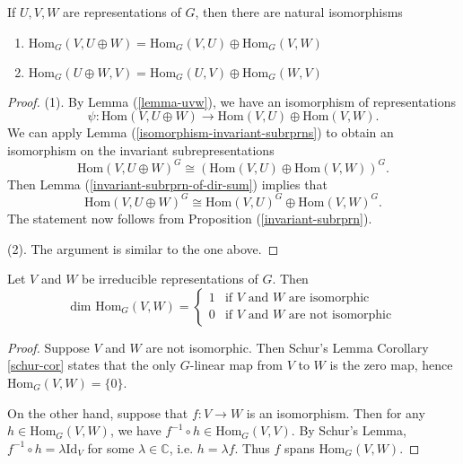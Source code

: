 \begin{cor}\label{invariant-subrprns-hom-spaces}
If  $U, V, W$ are representations of $G$, then there are natural isomorphisms
\begin{enumerate}
\item $\text{Hom}_G(V, U \oplus W) = \text{Hom}_G(V,U) \oplus \text{Hom}_G(V,W)$
\item $\text{Hom}_G(U \oplus W, V) = \text{Hom}_G(U, V) \oplus \text{Hom}_G(W ,V)$
\end{enumerate}
\end{cor}
\begin{proof}
(1). By Lemma (\ref{lemma-uvw}), we have an isomorphism of representations 
\[ \psi \colon \text{Hom}(V, U \oplus W) \to \text{Hom}(V, U) \oplus \text{Hom}(V,W). \]
We can apply Lemma (\ref{isomorphism-invariant-subrprns}) to obtain an isomorphism on the invariant subrepresentations
\[\text{Hom}(V, U \oplus W)^G \cong (\text{Hom}(V, U) \oplus \text{Hom}(V,W))^G.\]
Then Lemma (\ref{invariant-subrprn-of-dir-sum}) implies that 
\[\text{Hom}(V, U \oplus W)^G \cong \text{Hom}(V, U)^G \oplus \text{Hom}(V,W)^G. \]
The statement now follows from Proposition (\ref{invariant-subrprn}).

(2). The argument is similar to the one above.
\end{proof}

\begin{prop}\label{schurs-lemma-homvw}
Let $V$ and $W$ be irreducible representations of $G$.  Then
\[ \text{dim Hom}_G (V,W) =  \begin{cases} 
1 & \mbox{if $V$ and $W$ are isomorphic}  \\
0 &\mbox{if $V$ and $W$ are not isomorphic}
\end{cases} \]
\end{prop}
\begin{proof}
Suppose $V$ and $W$ are not isomorphic.  Then Schur's Lemma Corollary \ref{schur-cor} states that the only $G$-linear map from $V$ to $W$ is the zero map, hence $\text{Hom}_G(V,W) = \{ 0 \} $.

On the other hand, suppose that $f \colon V \to W$ is an isomorphism.  Then for any $h \in \text{Hom}_G(V,W)$, we have $f^{-1} \circ h \in \text{Hom}_G(V,V)$.  By Schur's Lemma, $f^{-1} \circ h = \lambda \text{Id}_V$ for some $\lambda \in \mathbb{C}$, i.e. $h = \lambda f$.  Thus $f$  spans $\text{Hom}_G(V,W)$.
\end{proof}

